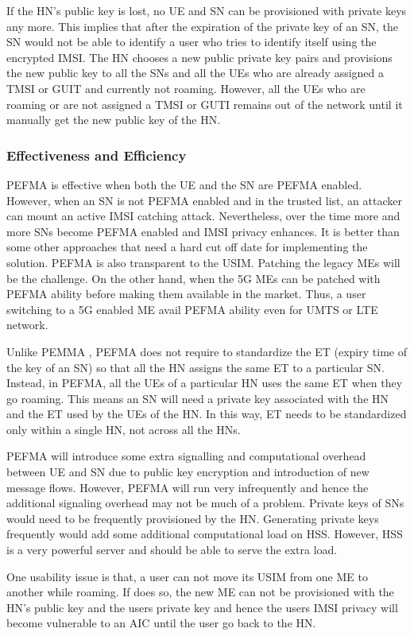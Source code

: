 \documentclass{river-journal}
\begin{document}
If the HN's public key is lost, no UE and SN can be provisioned with private keys any more. This implies that after the expiration of the private key of an SN, the SN would not be able to identify a user who tries to identify itself using the encrypted IMSI. The HN chooses a new public private key pairs and provisions the new public key to all the SNs and all the UEs who are already assigned a TMSI or GUIT and currently not roaming. However, all the UEs who are roaming or are not assigned a TMSI or GUTI remains out of the network until it manually get the new public key of the HN.

\subsubsection{Effectiveness and Efficiency}
PEFMA is effective when both the UE and the SN are PEFMA enabled. However, when an SN is not PEFMA enabled and in the trusted list, an attacker can mount an active IMSI catching attack. Nevertheless, over the time more and more SNs become PEFMA enabled and IMSI privacy enhances. It is better than some other approaches that need a hard cut off date for implementing the solution. PEFMA is also transparent to the USIM.  
Patching the legacy MEs will be the challenge. On the other hand, when the 5G MEs can be patched with PEFMA ability before making them available in the market. Thus, a user switching to a 5G enabled ME avail PEFMA ability even for UMTS or LTE network. 

Unlike PEMMA \cite{koienibe}, PEFMA does not require to standardize the ET (expiry time of the key of an SN) so that all the HN assigns the same ET to a particular SN. Instead, in PEFMA, all the UEs of a particular HN uses the same ET when they go roaming. This means an SN will need a private key associated with the HN and the ET used by the UEs of the HN. In this way, ET needs to be standardized only within a single HN, not across all the HNs.

PEFMA will introduce some extra signalling and computational overhead between UE and SN due to public key encryption and introduction of new message flows. However, PEFMA will run very infrequently and hence the additional signaling overhead may not be much of a problem. Private keys of SNs would need to be frequently provisioned by the HN. Generating private keys frequently would add some additional computational load on HSS. However, HSS is a very powerful server and should be able to serve the extra load.

One usability issue is that, a user can not move its USIM from one ME to another while roaming. If does so, the new ME can not be provisioned with the HN's public key and the users private key and hence the users IMSI privacy will become vulnerable to an AIC until the user go back to the HN.
\end{document}
